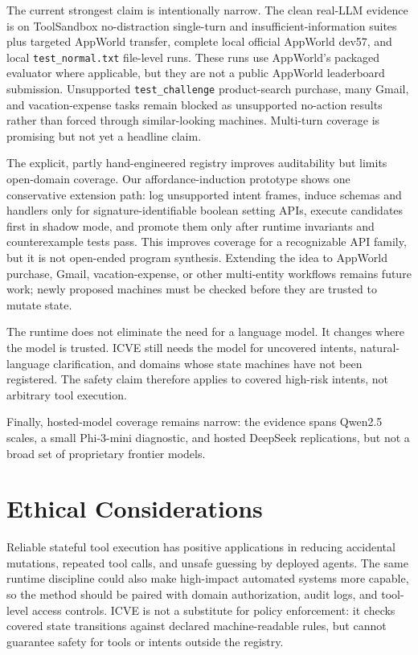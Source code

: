 \documentclass[11pt]{article}
\begin{document}
The current strongest claim is intentionally narrow. The clean real-LLM evidence is on
ToolSandbox no-distraction single-turn and insufficient-information suites plus targeted
AppWorld transfer, complete local official AppWorld dev57, and local
\texttt{test\_normal.txt} file-level runs. These runs use AppWorld's packaged evaluator
where applicable, but they are not a public AppWorld leaderboard submission. Unsupported
\texttt{test\_challenge} product-search purchase, many Gmail, and vacation-expense tasks
remain blocked as unsupported no-action results rather than forced through similar-looking
machines. Multi-turn coverage is promising but not yet a headline claim.

The explicit, partly hand-engineered registry improves auditability but limits open-domain
coverage. Our affordance-induction prototype shows one conservative extension path: log
unsupported intent frames, induce schemas and handlers only for signature-identifiable
boolean setting APIs, execute candidates first in shadow mode, and promote them only
after runtime invariants and counterexample tests pass. This improves coverage for a
recognizable API family, but it is not open-ended program synthesis. Extending the idea
to AppWorld purchase, Gmail, vacation-expense, or other multi-entity workflows remains future
work; newly proposed machines must be checked before they are trusted to mutate state.

The runtime does not eliminate the need for a language model. It changes where the model
is trusted. ICVE still needs the model for uncovered intents, natural-language
clarification, and domains whose state machines have not been registered. The safety claim
therefore applies to covered high-risk intents, not arbitrary tool execution.

Finally, hosted-model coverage remains narrow: the evidence spans Qwen2.5 scales, a
small Phi-3-mini diagnostic, and hosted DeepSeek replications, but not a broad set of
proprietary frontier models.

\section*{Ethical Considerations}

Reliable stateful tool execution has positive applications in reducing accidental
mutations, repeated tool calls, and unsafe guessing by deployed agents. The same runtime
discipline could also make high-impact automated systems more capable, so the method
should be paired with domain authorization, audit logs, and tool-level access controls.
ICVE is not a substitute for policy enforcement: it checks covered state transitions
against declared machine-readable rules, but cannot guarantee safety for tools or intents
outside the registry.
\end{document}
